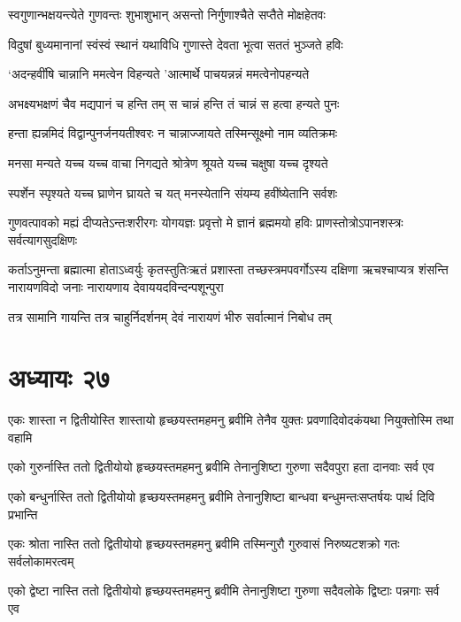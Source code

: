 \twolineshloka
{स्वगुणान्भक्षयन्त्येते गुणवन्तः शुभाशुभान्}
{असन्तो निर्गुणाश्चैते सप्तैते मोक्षहेतवः}


\twolineshloka
{विदुषां बुध्यमानानां स्वंस्वं स्थानं यथाविधि}
{गुणास्ते देवता भूत्वा सततं भुञ्जते हविः}


\twolineshloka
{`अदन्हवींषि चान्नानि ममत्वेन विहन्यते}
{'आत्मार्थे पाचयन्नन्नं ममत्वेनोपहन्यते}


\twolineshloka
{अभक्ष्यभक्षणं चैव मद्यपानं च हन्ति तम्}
{स चान्नं हन्ति तं चान्नं स हत्वा हन्यते पुनः}


\twolineshloka
{हन्ता ह्यन्नमिदं विद्वान्पुनर्जनयतीश्वरः}
{न चान्नाज्जायते तस्मिन्सूक्ष्मो नाम व्यतिक्रमः}


\twolineshloka
{मनसा मन्यते यच्च यच्च वाचा निगद्यते}
{श्रोत्रेण श्रूयते यच्च चक्षुषा यच्च दृश्यते}


\twolineshloka
{स्पर्शेन स्पृश्यते यच्च घ्राणेन घ्रायते च यत्}
{मनस्येतानि संयम्य हवींष्येतानि सर्वशः}


\threelineshloka
{गुणवत्पावको मह्यं दीप्यतेऽन्तःशरीरगः}
{योगयज्ञः प्रवृत्तो मे ज्ञानं ब्रह्ममयो हविः}
{प्राणस्तोत्रोऽपानशस्त्रः सर्वत्यागसुदक्षिणः}


कर्ताऽनुमन्ता ब्रह्मात्मा होताऽध्वर्युः कृतस्तुतिःऋतं प्रशास्ता तच्छस्त्रमपवर्गोऽस्य दक्षिणा
\twolineshloka
{ऋचश्चाप्यत्र शंसन्ति नारायणविदो जनाः}
{नारायणाय देवाययदविन्दन्पशून्पुरा}


\twolineshloka
{तत्र सामानि गायन्ति तत्र चाहुर्निदर्शनम्}
{देवं नारायणं भीरु सर्वात्मानं निबोध तम्}


\chapter{अध्यायः २७}
\twolineshloka
{एकः शास्ता न द्वितीयोस्ति शास्तायो हृच्छयस्तमहमनु ब्रवीमि}
{तेनैव युक्तः प्रवणादिवोदकंयथा नियुक्तोस्मि तथा वहामि}


\twolineshloka
{एको गुरुर्नास्ति ततो द्वितीयोयो हृच्छयस्तमहमनु ब्रवीमि}
{तेनानुशिष्टा गुरुणा सदैवपुरा हता दानवाः सर्व एव}


\twolineshloka
{एको बन्धुर्नास्ति ततो द्वितीयोयो हृच्छयस्तमहमनु ब्रवीमि}
{तेनानुशिष्टा बान्धवा बन्धुमन्तःसप्तर्षयः पार्थ दिवि प्रभान्ति}


\twolineshloka
{एकः श्रोता नास्ति ततो द्वितीयोयो हृच्छयस्तमहमनु ब्रवीमि}
{तस्मिन्गुरौ गुरुवासं निरुष्यटशक्रो गतः सर्वलोकामरत्वम्}


\twolineshloka
{एको द्वेष्टा नास्ति ततो द्वितीयोयो हृच्छयस्तमहमनु ब्रवीमि}
{तेनानुशिष्टा गुरुणा सदैवलोके द्विष्टाः पन्नगाः सर्व एव}


